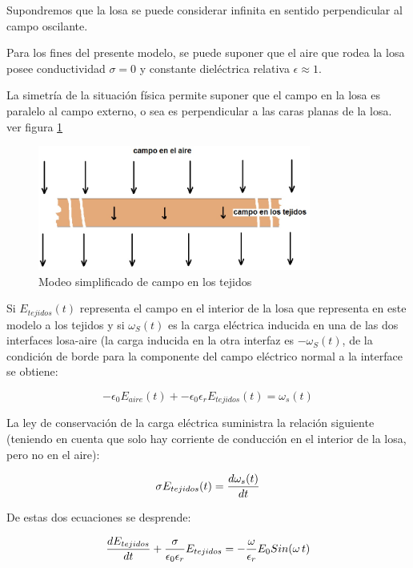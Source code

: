 Supondremos que la losa se puede considerar infinita en sentido perpendicular al campo oscilante.

Para los fines del presente modelo, se puede suponer que el aire que rodea la losa posee conductividad $\sigma=0$ y constante dieléctrica relativa $\epsilon \approx 1$.

La simetría de la situación física permite suponer que el campo en la losa es paralelo al campo externo, o sea es perpendicular a las caras planas de la losa. ver figura \ref{fig:610}

\begin{figure}[H]
    \centering
    \includegraphics[width=0.8\textwidth]{./Figures/fig610}
	\caption{Modeo simplificado de campo en los tejidos}
	\label{fig:610}
\end{figure}

Si $E_{tejidos}(t)$ representa el campo en el interior de la losa que representa en este modelo a los tejidos y si $\omega_{S}(t)$ es la carga eléctrica inducida en una de las dos interfaces losa-aire (la carga inducida en la otra interfaz es $-\omega_{S}(t)$, de la condición de borde para la componente del campo eléctrico normal a la interface se obtiene:

\begin{equation}
	-\epsilon_{0}E_{aire}(t) + -\epsilon_{0}\epsilon_{r} E_{tejidos}(t) = \omega_{s}(t)
\end{equation}

La ley de conservación de la carga eléctrica suministra la relación siguiente (teniendo en cuenta que solo hay corriente de conducción en el interior de la losa, pero no en el aire):

\begin{equation}
	\sigma E_{tejidos}(t) = \dfrac{d\omega_{s}(t)}{dt}
\end{equation}

De estas dos ecuaciones se desprende: 

\begin{equation}
	\dfrac{dE_{tejidos}}{dt}+ \dfrac{\sigma}{\epsilon_{0}\epsilon_{r}}E_{tejidos}=-\dfrac{\omega}{\epsilon_{r}}E_{0}Sin(\omega\,t)
\end{equation}

